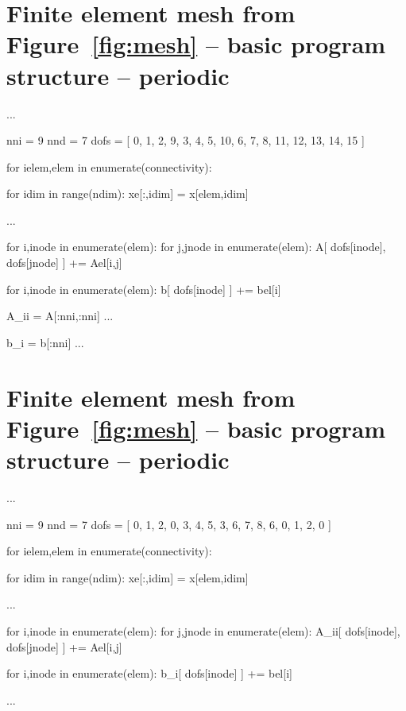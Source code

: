 \documentclass[times,namecite]{goose-article}
\begin{document}
\newpage
\section{Finite element mesh from Figure~\ref{fig:mesh} -- basic program structure -- periodic}
\label{sec:code:per}

\begin{python}
...

nni  = 9
nnd  = 7
dofs = [ 0, 1, 2, 9, 3, 4, 5, 10, 6, 7, 8, 11, 12, 13, 14, 15 ]

for ielem,elem in enumerate(connectivity):

  for idim in range(ndim):
    xe[:,idim] = x[elem,idim]

  ...

  for i,inode in enumerate(elem):
    for j,jnode in enumerate(elem):
      A[ dofs[inode], dofs[jnode] ] += Ael[i,j]

  for i,inode in enumerate(elem):
    b[ dofs[inode] ] += bel[i]

A_ii = A[:nni,:nni]
...

b_i = b[:nni]
...
\end{python}

\newpage
\section{Finite element mesh from Figure~\ref{fig:mesh} -- basic program structure -- periodic}
\label{sec:code:per:assembly}

\begin{python}
...

nni  = 9
nnd  = 7
dofs = [ 0, 1, 2, 0, 3, 4, 5, 3, 6, 7, 8, 6, 0, 1, 2, 0 ]

for ielem,elem in enumerate(connectivity):

  for idim in range(ndim):
    xe[:,idim] = x[elem,idim]

  ...

  for i,inode in enumerate(elem):
    for j,jnode in enumerate(elem):
      A_ii[ dofs[inode], dofs[jnode] ] += Ael[i,j]

  for i,inode in enumerate(elem):
    b_i[ dofs[inode] ] += bel[i]

...
\end{python}

\pagestyle{empty}
\setlength\parindent{0pt}
\end{document}

